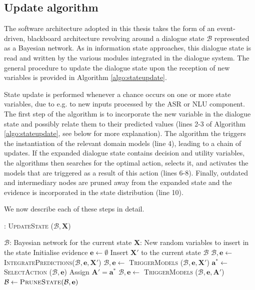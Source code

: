 \subsection{Update algorithm}

The software architecture adopted in this thesis takes the form of an event-driven, blackboard architecture \cite{Buckley:2006} revolving around a dialogue state $\mathcal{B}$ represented as a Bayesian network.  As in information state approaches, this dialogue state is read and written by the various modules integrated in the dialogue system. The general procedure to update the dialogue state upon the reception of new variables is provided in Algorithm \ref{algo:stateupdate}.
 
State update is performed whenever a chance occurs on one or more state variables, due to e.g. to new inputs processed by the ASR or NLU component. The first step of the algorithm is to incorporate the new variable in the dialogue state and possibly relate them to their predicted values (lines 2-3 of Algorithm \ref{algo:stateupdate}, see below for more explanation). The algorithm the triggers the instantiation of the relevant domain models (line 4), leading to a chain of updates.  If the expanded dialogue state contains decision and utility variables, the algorithms then searches for the optimal action, selects it, and activates the models that are triggered as a result of this action  (lines 6-8). Finally, outdated and intermediary nodes are pruned away from the expanded state and the evidence is incorporated in the state distribution (line 10). 

We now describe each of these steps in detail.

\begin{algorithm}[h]
\caption{: \textsc{UpdateState} ($\mathcal{B}, \mathbf{X}$)}
\begin{algorithmic}[1] \vspace{1mm}
\REQUIRE $\mathcal{B}$: Bayesian network for the current state
\REQUIRE $\mathbf{X}$: New random variables to insert in the state \vspace{1mm}
\STATE Initialise evidence $\mathbf{e} \leftarrow \emptyset$
\STATE Insert $\mathbf{X}'$ to the current state $\mathcal{B}$ 
\STATE $\mathcal{B}, \mathbf{e} \leftarrow $ \textsc{IntegratePredictions}($\mathcal{B}, \mathbf{e}, \mathbf{X}'$)
\STATE $\mathcal{B}, \mathbf{e} \leftarrow$ \textsc{TriggerModels} ($\mathcal{B}, \mathbf{e},  \mathbf{X}'$) \vspace{1mm}
\STATE $\mathbf{a}^* \leftarrow $ \textsc{SelectAction} ($\mathcal{B}, \mathbf{e}$)
\STATE Assign $\mathbf{A}' = \mathbf{a}^*$
\STATE $\mathcal{B}, \mathbf{e} \leftarrow$ \textsc{TriggerModels} ($\mathcal{B}, \mathbf{e}, \mathbf{A}'$)
\ENDWHILE \vspace{1mm}
\STATE $\mathcal{B} \leftarrow \textsc{PruneState} (\mathcal{B}, \mathbf{e})$ \vspace{1mm}
\end{algorithmic}
\label{algo:stateupdate}
\end{algorithm}

